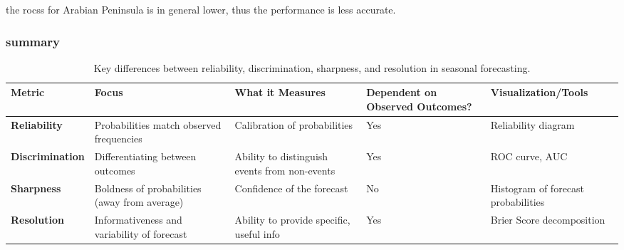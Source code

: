 the rocss for Arabian Peninsula is in general lower, thus the performance is less accurate.


\subsubsection{summary}
\begin{table}[h!]
\centering
\begin{tabularx}{\textwidth}{@{}p{2.5cm}p{4cm}p{4cm}p{2.5cm}p{3cm}@{}}
\toprule
\textbf{Metric}       & \textbf{Focus}                                    & \textbf{What it Measures}                         & \textbf{Dependent on Observed Outcomes?} & \textbf{Visualization/Tools}             \\ \midrule
\textbf{Reliability}   & Probabilities match observed frequencies          & Calibration of probabilities                      & Yes                                      & Reliability diagram                      \\
\textbf{Discrimination} & Differentiating between outcomes                 & Ability to distinguish events from non-events    & Yes                                      & ROC curve, AUC                           \\
\textbf{Sharpness}     & Boldness of probabilities (away from average)     & Confidence of the forecast                        & No                                       & Histogram of forecast probabilities      \\
\textbf{Resolution}    & Informativeness and variability of forecast       & Ability to provide specific, useful info         & Yes                                      & Brier Score decomposition                \\ \bottomrule
\end{tabularx}
\caption{Key differences between reliability, discrimination, sharpness, and resolution in seasonal forecasting.}
\label{tab:forecast_metrics}
\end{table}

\newpage
\thispagestyle{empty}
\mbox{}

\endinput

